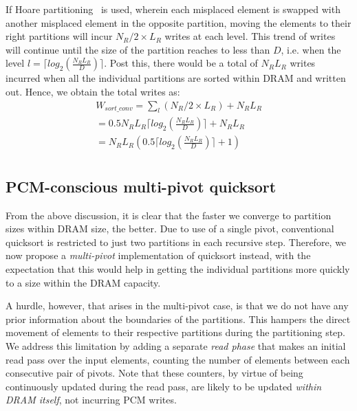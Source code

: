 If Hoare partitioning~\cite{cormen} is used, wherein each misplaced
element is swapped with another misplaced element in the opposite
partition, moving the elements to their right partitions will incur $N_R/2
\times L_R$ writes at each level. This trend of writes will continue
until the size of the partition reaches to less than $D$, i.e. when the
level $l = \lceil log_2 (\frac{N_R L_R}{D}) \rceil$. Post this, there
would be a total of $N_R L_R$ writes incurred when all the individual
partitions are sorted within DRAM and written out. Hence, we
obtain the total writes as:
\begin{equation}
\label{eq:sort_conv}
\begin{split}
W_{sort\_conv} = \sum_l (N_R/2 \times L_R) + N_R L_R\\
= 0.5N_RL_R \lceil log_2(\frac{N_R L_R}{D}) \rceil + N_R L_R\\
  = N_RL_R (0.5 \lceil log_2(\frac{N_R L_R}{D}) \rceil + 1) \\
\end{split}
\end{equation}



\begin{comment}
In the quicksort algorithm on randomly permuted $N_R$ tuples, the average number of swaps is $0.33N_Rln(N_R)$ \cite{swaps}. If each pair of swapped tuples gets evicted from DRAM to PCM after each intermediate swap, there will be two tuple writes (of $L_R$ bytes each) in PCM per pair of swapped tuples. Hence, the total number of writes is given by:  
\end{comment}

\subsection{PCM-conscious multi-pivot quicksort}
\label{subsec:sort_mpivot}
From the above discussion, it is clear that the faster we converge to
partition sizes within DRAM size, the better. Due to use of a single
pivot, conventional quicksort is restricted to just two partitions in each
recursive step. Therefore, we now propose a \emph{multi-pivot} implementation of
quicksort instead, with the expectation that this would help in getting the
individual partitions more quickly to a size within the DRAM capacity.

A hurdle, however, that arises in the multi-pivot case, is that we do
not have any prior information about the boundaries of the partitions.
This hampers the direct movement of elements to their respective
partitions during the partitioning step. We address this limitation
by adding a separate \textit{read phase} that makes an initial read
pass over the input elements, counting the number of elements between
each consecutive pair of pivots. Note that these counters, by virtue
of being continuously updated during the read pass, are likely to be
updated \emph{within DRAM itself}, not incurring PCM writes.

